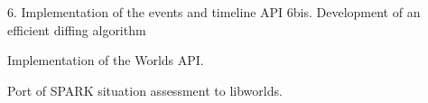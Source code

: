 \documentclass[a4paper]{article}
\begin{document}
6. Implementation of the events and timeline API
6bis. Development of an efficient diffing algorithm
\setcounter{listcnt0}{0}
\begin{list}{.}
{
\addtocounter{listcnt0}{6}
\setlength{\rightmargin}{\leftmargin}
}

\item Implementation of the Worlds API.

\item Port of SPARK situation assessment to libworlds.
\end{list}



\end{document}
